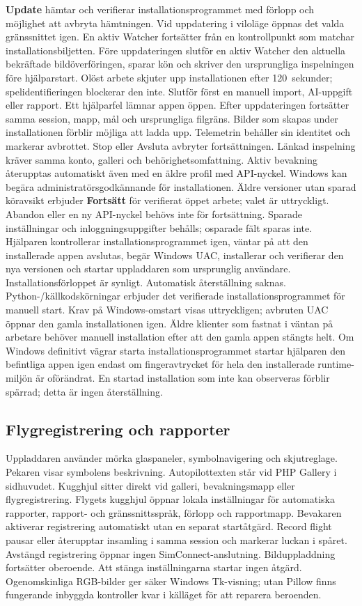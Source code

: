 \documentclass[11pt,a4paper]{article}
\newcommand{\ui}[1]{\textbf{#1}}
\begin{document}
\ui{Update} hämtar och verifierar installationsprogrammet med förlopp och
möjlighet att avbryta hämtningen. Vid uppdatering i viloläge öppnas det valda
gränssnittet igen. En aktiv Watcher fortsätter från en kontrollpunkt som
matchar installationsbiljetten. Före uppdateringen slutför en aktiv Watcher
den aktuella bekräftade bildöverföringen, sparar kön och skriver den ursprungliga
inspelningen före hjälparstart. Olöst arbete skjuter upp installationen efter
120~sekunder; spelidentifieringen blockerar den inte. Slutför först en manuell
import, AI-uppgift eller rapport. Ett hjälparfel lämnar appen öppen.
Efter uppdateringen fortsätter samma session, mapp, mål och ursprungliga
filgräns. Bilder som skapas under installationen förblir möjliga att ladda upp.
Telemetrin behåller sin identitet och markerar avbrottet. Stop eller Avsluta
avbryter fortsättningen. Länkad inspelning kräver samma konto, galleri och
behörighetsomfattning. Aktiv bevakning återupptas automatiskt även med
en äldre profil med API-nyckel. Windows kan begära administratörsgodkännande
för installationen. Äldre versioner utan sparad köravsikt erbjuder
\ui{Fortsätt} för verifierat öppet arbete; valet är uttryckligt.
Abandon eller en ny API-nyckel behövs inte för fortsättning. Sparade
inställningar och inloggningsuppgifter behålls; osparade fält sparas inte.
Hjälparen kontrollerar installationsprogrammet igen, väntar
på att den installerade appen avslutas, begär Windows UAC, installerar och
verifierar den nya versionen och startar uppladdaren som ursprunglig användare.
Installationsförloppet är synligt. Automatisk återställning saknas.
Python-/källkodskörningar erbjuder det verifierade installationsprogrammet för
manuell start. Krav på Windows-omstart visas uttryckligen; avbruten UAC öppnar
den gamla installationen igen. Äldre klienter som fastnat i väntan på arbetare
behöver manuell installation efter att den gamla appen stängts helt.
Om Windows definitivt vägrar starta installationsprogrammet startar hjälparen
den befintliga appen igen endast om fingeravtrycket för hela den installerade
runtime-miljön är oförändrat. En startad installation som inte kan observeras förblir spärrad;
detta är ingen återställning.


\subsection{Flygregistrering och rapporter}

Uppladdaren använder mörka glaspaneler, symbolnavigering och skjutreglage.
Pekaren visar symbolens beskrivning. Autopilottexten
står vid PHP Gallery i sidhuvudet. Kugghjul sitter direkt vid galleri,
bevakningsmapp eller flygregistrering. Flygets kugghjul öppnar lokala
inställningar för automatiska rapporter, rapport- och gränssnittsspråk,
förlopp och rapportmapp. Bevakaren aktiverar registrering automatiskt utan
en separat startåtgärd. Record flight pausar eller återupptar insamling i
samma session och markerar luckan i spåret. Avstängd registrering öppnar
ingen SimConnect-anslutning. Bilduppladdning fortsätter oberoende.
Att stänga inställningarna startar ingen åtgärd. Ogenomskinliga RGB-bilder
ger säker Windows Tk-visning; utan Pillow finns fungerande inbyggda
kontroller kvar i källäget för att reparera beroenden.
\end{document}
